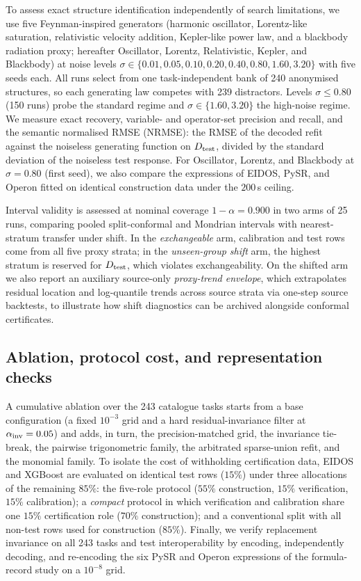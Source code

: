 To assess exact structure identification independently of search limitations, we use five Feynman-inspired generators (harmonic oscillator, Lorentz-like saturation, relativistic velocity addition, Kepler-like power law, and a blackbody radiation proxy; hereafter Oscillator, Lorentz, Relativistic, Kepler, and Blackbody) at noise levels \(\sigma\in\{0.01,0.05,0.10,0.20,0.40,0.80,1.60,3.20\}\) with five seeds each. All runs select from one task-independent bank of 240 anonymised structures, so each generating law competes with 239 distractors. Levels \(\sigma\le0.80\) (150 runs) probe the standard regime and \(\sigma\in\{1.60,3.20\}\) the high-noise regime. We measure exact recovery, variable- and operator-set precision and recall, and the semantic normalised RMSE (NRMSE): the RMSE of the decoded refit against the noiseless generating function on \(D_{\rm test}\), divided by the standard deviation of the noiseless test response. For Oscillator, Lorentz, and Blackbody at \(\sigma=0.80\) (first seed), we also compare the expressions of EIDOS, PySR, and Operon fitted on identical construction data under the \(200\)\,s ceiling.

Interval validity is assessed at nominal coverage \(1-\alpha=0.900\) in two arms of 25 runs, comparing pooled split-conformal and Mondrian intervals with nearest-stratum transfer under shift. In the \emph{exchangeable} arm, calibration and test rows come from all five proxy strata; in the \emph{unseen-group shift} arm, the highest stratum is reserved for \(D_{\rm test}\), which violates exchangeability. On the shifted arm we also report an auxiliary source-only \emph{proxy-trend envelope}, which extrapolates residual location and log-quantile trends across source strata via one-step source backtests, to illustrate how shift diagnostics can be archived alongside conformal certificates.

\subsection{Ablation, protocol cost, and representation checks}\label{sec:ablationdesign}

A cumulative ablation over the 243 catalogue tasks starts from a base configuration (a fixed \(10^{-3}\) grid and a hard residual-invariance filter at \(\alpha_{\rm inv}=0.05\)) and adds, in turn, the precision-matched grid, the invariance tie-break, the pairwise trigonometric family, the arbitrated sparse-union refit, and the monomial family. To isolate the cost of withholding certification data, EIDOS and XGBoost are evaluated on identical test rows (\(15\%\)) under three allocations of the remaining \(85\%\): the five-role protocol (\(55\%\) construction, \(15\%\) verification, \(15\%\) calibration); a \emph{compact} protocol in which verification and calibration share one \(15\%\) certification role (\(70\%\) construction); and a conventional split with all non-test rows used for construction (\(85\%\)). Finally, we verify replacement invariance on all 243 tasks and test interoperability by encoding, independently decoding, and re-encoding the six PySR and Operon expressions of the formula-record study on a \(10^{-8}\) grid.

